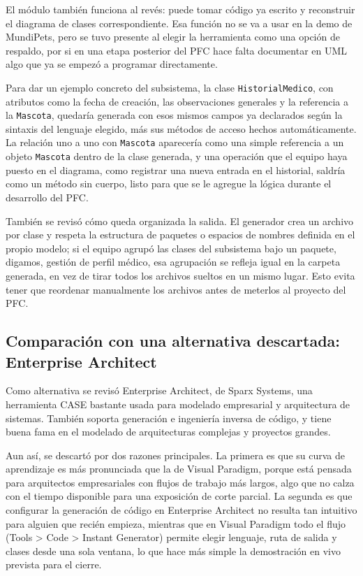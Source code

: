 \documentclass[journal,onecolumn]{IEEEtran}
\begin{document}
	El módulo también funciona al revés: puede tomar código ya escrito y reconstruir el diagrama de clases correspondiente. Esa función no se va a usar en la demo de MundiPets, pero se tuvo presente al elegir la herramienta como una opción de respaldo, por si en una etapa posterior del PFC hace falta documentar en UML algo que ya se empezó a programar directamente.
	
	Para dar un ejemplo concreto del subsistema, la clase \texttt{HistorialMedico}, con atributos como la fecha de creación, las observaciones generales y la referencia a la \texttt{Mascota}, quedaría generada con esos mismos campos ya declarados según la sintaxis del lenguaje elegido, más sus métodos de acceso hechos automáticamente. La relación uno a uno con \texttt{Mascota} aparecería como una simple referencia a un objeto \texttt{Mascota} dentro de la clase generada, y una operación que el equipo haya puesto en el diagrama, como registrar una nueva entrada en el historial, saldría como un método sin cuerpo, listo para que se le agregue la lógica durante el desarrollo del PFC.
	
	También se revisó cómo queda organizada la salida. El generador crea un archivo por clase y respeta la estructura de paquetes o espacios de nombres definida en el propio modelo; si el equipo agrupó las clases del subsistema bajo un paquete, digamos, gestión de perfil médico, esa agrupación se refleja igual en la carpeta generada, en vez de tirar todos los archivos sueltos en un mismo lugar. Esto evita tener que reordenar manualmente los archivos antes de meterlos al proyecto del PFC.
	
	\subsection{Comparación con una alternativa descartada: Enterprise Architect}
	
	Como alternativa se revisó Enterprise Architect, de Sparx Systems, una herramienta CASE bastante usada para modelado empresarial y arquitectura de sistemas. También soporta generación e ingeniería inversa de código, y tiene buena fama en el modelado de arquitecturas complejas y proyectos grandes.
	
	Aun así, se descartó por dos razones principales. La primera es que su curva de aprendizaje es más pronunciada que la de Visual Paradigm, porque está pensada para arquitectos empresariales con flujos de trabajo más largos, algo que no calza con el tiempo disponible para una exposición de corte parcial. La segunda es que configurar la generación de código en Enterprise Architect no resulta tan intuitivo para alguien que recién empieza, mientras que en Visual Paradigm todo el flujo (Tools \textgreater{} Code \textgreater{} Instant Generator) permite elegir lenguaje, ruta de salida y clases desde una sola ventana, lo que hace más simple la demostración en vivo prevista para el cierre.
	
\end{document}
